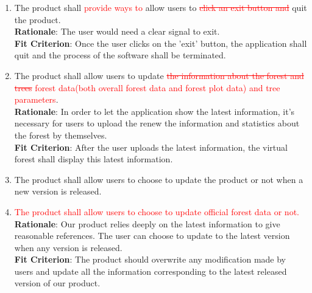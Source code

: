 \documentclass{article}
\begin{document}
\begin{enumerate}[FR1]
	\item The product shall \textcolor{red}{provide ways to }allow users to \textcolor{red}{\st{click
	 an exit button and}} quit the product.\\
	\textbf{Rationale}: The user would need a clear signal to exit.\\
	\textbf{Fit Criterion}: Once the user clicks on the 'exit' button, the application shall quit and the process of the software shall be terminated.
    
    \item The product shall allow users to update \textcolor{red}{\st{the information about the forest
     and trees} forest data(both overall forest data and forest plot data) and tree parameters}.\\
	\textbf{Rationale}: In order to let the application show the latest information, it's necessary for
	 users to upload the renew the information and statistics about the forest by themselves.\\
	\textbf{Fit Criterion}: After the user uploads the latest information, the virtual forest shall
	 display this latest information. 
	
	\item The product shall allow users to choose to update the product or not when a new version is
	 released. 
	 
	 \item \textcolor{red}{The product shall allow users to choose to update official forest data or
	 not.}\\
	\textbf{Rationale}: Our product relies deeply on the latest information to give reasonable
	 references. The user can choose to update to the latest version when any version is released.\\
	\textbf{Fit Criterion}: The product should overwrite any modification made by users and update all
	 the information corresponding to the latest released version of our product.
\end{enumerate}
\end{document}
